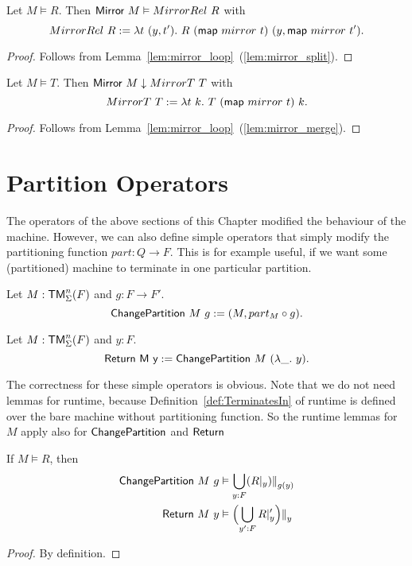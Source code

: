 \begin{lemma}
  Let $M \vDash R$.  Then $\textsf{Mirror}~M \vDash MirrorRel~R$ with
  \[
    MirrorRel~R := \lambda t~(y, t').~ R~(\textsf{map}~mirror~t)~(y, \textsf{map}~mirror~t').
  \]
\end{lemma}
\begin{proof}
  Follows from Lemma~\ref{lem:mirror_loop}~(\ref{lem:mirror_split}).
\end{proof}
\begin{lemma}
  Let $M \vDash T$.  Then $\textsf{Mirror}~M \downarrow MirrorT~T$ with
  \[
    MirrorT~T := \lambda t~k.~ T~(\textsf{map}~mirror~t)~k.
  \]
\end{lemma}
\begin{proof}
  Follows from Lemma~\ref{lem:mirror_loop}~(\ref{lem:mirror_merge}).
\end{proof}




\section{Partition Operators}
\label{sec:partition-op}

The operators of the above sections of this Chapter modified the behaviour of the machine.  However, we can also define simple operators that simply
modify the partitioning function $part : Q \to F$.  This is for example useful, if we want some (partitioned) machine to terminate in one particular
partition.

\begin{definition}[$\MS{ChangePartition}$]
  Let $M:\textsf{TM}_\Sigma^n(F)$ and $g : F \to F'$.
  \[ \textsf{ChangePartition}~M~g := (M, part_M \circ g). \]
\end{definition}

\begin{definition}
  Let $M:\textsf{TM}_\Sigma^n(F)$ and $y:F$.
  \[ \textsf{Return~M~y} := \textsf{ChangePartition}~M~(\lambda \_.~y). \]
\end{definition}

The correctness for these simple operators is obvious.  Note that we do not need lemmas for runtime, because Definition~\ref{def:TerminatesIn} of
runtime is defined over the bare machine without partitioning function.  So the runtime lemmas for $M$ apply also for $\MS{ChangePartition}$ and
$\textsf{Return}$
\begin{lemma}
  If $M \vDash R$, then
  \begin{alignat*}{1}
    \textsf{ChangePartition}~M~g & \vDash \bigcup_{y:F} (R {|}_{y}) {|\mkern-1.5mu|}_{g(y)} \\
    \textsf{Return}~M~y          & \vDash \Bigl( \bigcup_{y':F} R {|}_{y}' \Bigr) {|\mkern-1.5mu|}_{y}
  \end{alignat*}
\end{lemma}
\begin{proof}
  By definition.
\end{proof}


